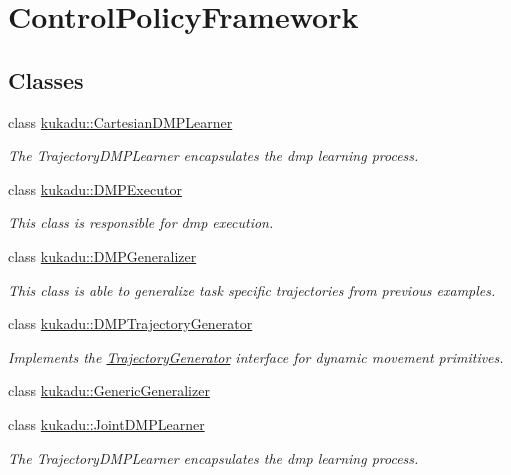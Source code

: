 \hypertarget{group__ControlPolicyFramework}{\section{Control\-Policy\-Framework}
\label{group__ControlPolicyFramework}
}
\subsection*{Classes}
\begin{DoxyCompactItemize}
\item 
class \hyperlink{classkukadu_1_1CartesianDMPLearner}{kukadu\-::\-Cartesian\-D\-M\-P\-Learner}
\begin{DoxyCompactList}\small\item\em The Trajectory\-D\-M\-P\-Learner encapsulates the dmp learning process. \end{DoxyCompactList}\item 
class \hyperlink{classkukadu_1_1DMPExecutor}{kukadu\-::\-D\-M\-P\-Executor}
\begin{DoxyCompactList}\small\item\em This class is responsible for dmp execution. \end{DoxyCompactList}\item 
class \hyperlink{classkukadu_1_1DMPGeneralizer}{kukadu\-::\-D\-M\-P\-Generalizer}
\begin{DoxyCompactList}\small\item\em This class is able to generalize task specific trajectories from previous examples. \end{DoxyCompactList}\item 
class \hyperlink{classkukadu_1_1DMPTrajectoryGenerator}{kukadu\-::\-D\-M\-P\-Trajectory\-Generator}
\begin{DoxyCompactList}\small\item\em Implements the \hyperlink{classkukadu_1_1TrajectoryGenerator}{Trajectory\-Generator} interface for dynamic movement primitives. \end{DoxyCompactList}\item 
class \hyperlink{classkukadu_1_1GenericGeneralizer}{kukadu\-::\-Generic\-Generalizer}
\item 
class \hyperlink{classkukadu_1_1JointDMPLearner}{kukadu\-::\-Joint\-D\-M\-P\-Learner}
\begin{DoxyCompactList}\small\item\em The Trajectory\-D\-M\-P\-Learner encapsulates the dmp learning process. \end{DoxyCompactList}\item 

\end{DoxyCompactItemize}
